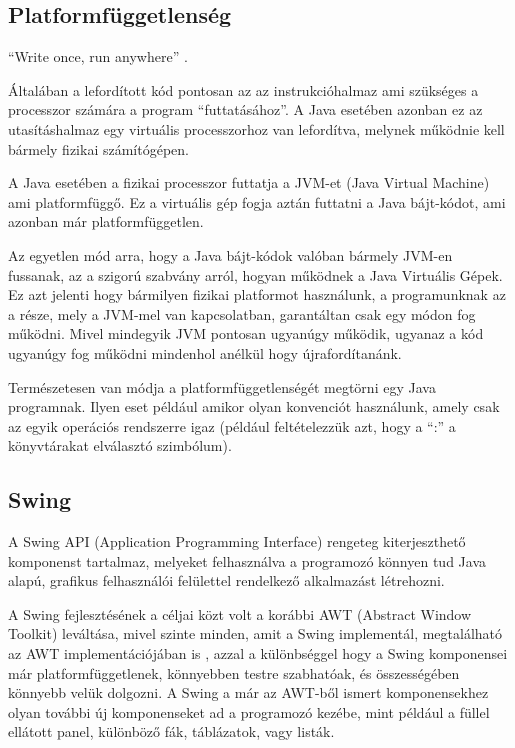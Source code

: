 \documentclass[a4paper,12pt]{report}
\begin{document}
\subsection{Platformfüggetlenség}
\label{platformfugg}

``Write once, run anywhere'' \cite{wora}.

\vspace{2mm}
Általában a lefordított kód pontosan az az instrukcióhalmaz ami szükséges a processzor számára a program ``futtatásához''. A Java esetében azonban ez az utasításhalmaz egy virtuális processzorhoz van lefordítva, melynek működnie kell bármely fizikai számítógépen.

\vspace{2mm}
A Java esetében a fizikai processzor futtatja a JVM-et (Java Virtual Machine) ami platformfüggő. Ez a virtuális gép fogja aztán futtatni a Java bájt-kódot, ami azonban már platformfüggetlen. 

\vspace{2mm}
Az egyetlen mód arra, hogy a Java bájt-kódok valóban bármely JVM-en fussanak, az a szigorú szabvány arról, hogyan működnek a Java Virtuális Gépek. Ez azt jelenti hogy bármilyen fizikai platformot használunk, a programunknak az a része, mely a JVM-mel van kapcsolatban, garantáltan csak egy módon fog működni. Mivel mindegyik JVM pontosan ugyanúgy működik, ugyanaz a kód ugyanúgy fog működni mindenhol anélkül hogy újrafordítanánk.

\vspace{2mm}
Természetesen van módja a platformfüggetlenségét megtörni egy Java programnak. Ilyen eset például amikor olyan konvenciót használunk, amely csak az egyik operációs rendszerre igaz (például feltételezzük azt, hogy a ``:'' a könyvtárakat elválasztó szimbólum).

\subsection{Swing}
\label{swing}

A Swing API (Application Programming Interface) rengeteg kiterjeszthető komponenst tartalmaz, melyeket felhasználva a programozó könnyen tud Java alapú, grafikus felhasználói felülettel rendelkező alkalmazást létrehozni. 

\vspace{2mm}
A Swing fejlesztésének a céljai közt volt a korábbi AWT (Abstract Window Toolkit) leváltása, mivel szinte minden, amit a Swing implementál, megtalálható az AWT implementációjában is \cite{awt}, azzal a különbséggel hogy a Swing komponensei már platformfüggetlenek, könnyebben testre szabhatóak, és összességében könnyebb velük dolgozni. A Swing a már az AWT-ből ismert komponensekhez olyan további új komponenseket ad a programozó kezébe, mint például a füllel ellátott panel, különböző fák, táblázatok, vagy listák.
\end{document}
